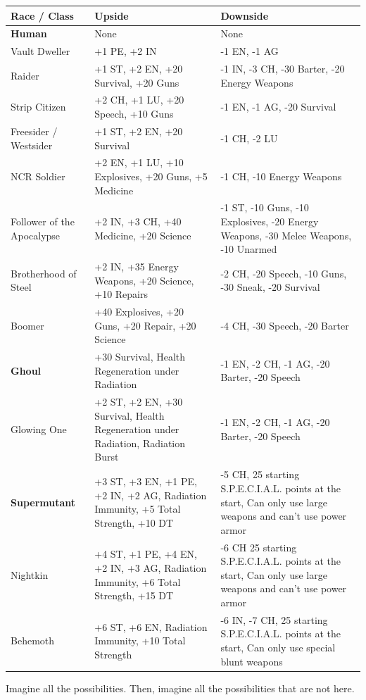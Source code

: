 \documentclass[11pt]{article} %
\begin{document}
\begin{longtable}{|p{4cm}|p{5cm}|p{5cm}|}
\hline
\bfseries Race / Class & \bfseries Upside & \bfseries Downside \\
\hline
\endhead
\bfseries Human & None & None \\
Vault Dweller & +1 PE, +2 IN & -1 EN, -1 AG  \\
Raider & +1 ST, +2 EN, +20 Survival, +20 Guns & -1 IN, -3 CH, -30 Barter, -20 Energy Weapons \\
Strip Citizen & +2 CH, +1 LU, +20 Speech, +10 Guns & -1 EN, -1 AG, -20 Survival \\ 
Freesider / Westsider & +1 ST, +2 EN, +20 Survival & -1 CH, -2 LU \\
NCR Soldier & +2 EN, +1 LU, +10 Explosives, +20 Guns, +5 Medicine & -1 CH, -10 Energy Weapons \\
Follower of the Apocalypse & +2 IN, +3 CH, +40 Medicine, +20 Science & -1 ST, -10 Guns, -10 Explosives, -20 Energy Weapons, -30 Melee Weapons, -10 Unarmed \\
Brotherhood of Steel & +2 IN, +35 Energy Weapons, +20 Science, +10 Repairs & -2 CH, -20 Speech, -10 Guns, -30 Sneak, -20 Survival \\
Boomer & +40 Explosives, +20 Guns, +20 Repair, +20 Science & -4 CH, -30 Speech, -20 Barter \\
\bfseries Ghoul & +30 Survival, Health Regeneration under Radiation & -1 EN, -2 CH, -1 AG, -20 Barter, -20 Speech \\
Glowing One & +2 ST, +2 EN, +30 Survival, Health Regeneration under Radiation, Radiation Burst & -1 EN, -2 CH, -1 AG, -20 Barter, -20 Speech \\
\bfseries Supermutant & +3 ST, +3 EN, +1 PE, +2 IN, +2 AG, Radiation Immunity, +5 Total Strength, +10 DT & -5 CH, 25 starting S.P.E.C.I.A.L. points at the start, Can only use large weapons and can't use power armor \\
Nightkin & +4 ST, +1 PE, +4 EN, +2 IN, +3 AG, Radiation Immunity, +6 Total Strength, +15 DT & -6 CH 25 starting S.P.E.C.I.A.L. points at the start, Can only use large weapons and can't use power armor \\
Behemoth & +6 ST, +6 EN, Radiation Immunity, +10 Total Strength & -6 IN, -7 CH, 25 starting S.P.E.C.I.A.L. points at the start, Can only use special blunt weapons \\
\hline
\end{longtable}{\begin{center}Imagine all the possibilities. Then, imagine all the possibilities that are not here.\end{center}}
\end{document}
